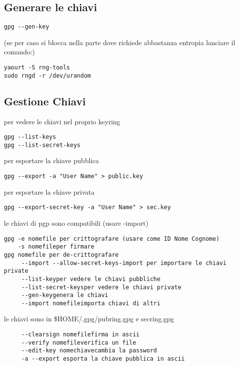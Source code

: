 \documentclass[]{article}
\begin{document}
\subsection{Generare le chiavi}\label{generare-le-chiavi}

\begin{verbatim}
gpg --gen-key
\end{verbatim}

(se per caso si blocca nella parte dove richiede abbastanza entropia
lanciare il comando:)

\begin{verbatim}
yaourt -S rng-tools
sudo rngd -r /dev/urandom
\end{verbatim}

\subsection{Gestione Chiavi}\label{gestione-chiavi}

per vedere le chiavi nel proprio keyring

\begin{verbatim}
gpg --list-keys
gpg --list-secret-keys
\end{verbatim}

per esportare la chiave pubblica

\begin{verbatim}
gpg --export -a "User Name" > public.key
\end{verbatim}

per esportare la chiave privata

\begin{verbatim}
gpg --export-secret-key -a "User Name" > sec.key
\end{verbatim}

le chiavi di pgp sono compatibili (usare -import)

\begin{verbatim}
gpg -e nomefile per crittografare (usare come ID Nome Cognome)
    -s nomefileper firmare
gpg nomefile per de-crittografare 
     --import --allow-secret-keys-import per importare le chiavi private
     --list-keyper vedere le chiavi pubbliche
     --list-secret-keysper vedere le chiavi private
     --gen-keygenera le chiavi
     --import nomefileimporta chiavi di altri
\end{verbatim}

le chiavi sono in \$HOME/.gpg/pubring.gpg e secring.gpg

\begin{verbatim}
     --clearsign nomefilefirma in ascii
     --verify nomefileverifica un file
     --edit-key nomechiavecambia la password
     -a --export esporta la chiave pubblica in ascii
\end{verbatim}
\end{document}
